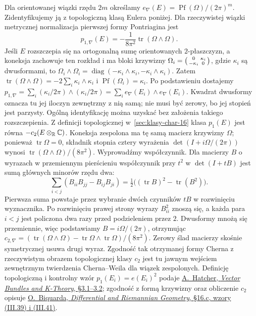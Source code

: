 \begin{przyklad}
\label{prz:euler-p1-CW-26}
Dla orientowanej wiązki rzędu $2m$ określamy
$e_\nabla(E)=\operatorname{Pf}(\Omega)/(2\pi)^m$.
Zidentyfikujemy ją z topologiczną klasą
Eulera poniżej. Dla rzeczywistej wiązki
metrycznej normalizacja pierwszej formy
Pontriagina jest
\[
 p_{1,\nabla}(E)=
 -\frac{1}{8\pi^2}\operatorname{tr}
                (\Omega\wedge\Omega).
\]
Jeśli $E$ rozszczepia się na ortogonalną
sumę orientowanych $2$-płaszczyzn,
a koneksja zachowuje ten rozkład
i ma bloki krzywizny
$\Omega_i=\begin{psmallmatrix}0&\kappa_i\\-\kappa_i&0\end{psmallmatrix}$,
gdzie $\kappa_i$ są dwusformami, to
$\Omega_i\wedge\Omega_i
=\operatorname{diag}(-\kappa_i\wedge\kappa_i,
                     -\kappa_i\wedge\kappa_i)$.
Zatem $\operatorname{tr}(\Omega\wedge\Omega)
=-2\sum_i\kappa_i\wedge\kappa_i$ i
$\operatorname{Pf}(\Omega_i)=\kappa_i$.
Po podstawieniu dostajemy
$p_{1,\nabla}=\sum_i(\kappa_i/2\pi)\wedge(\kappa_i/2\pi)
=\sum_i e_\nabla(E_i)\wedge e_\nabla(E_i)$.
Kwadrat dwusformy oznacza tu jej iloczyn zewnętrzny
z nią samą; nie musi być zerowy, bo jej stopień jest parzysty.
Ogólną identyfikację można uzyskać bez
założenia takiego rozszczepienia. Z definicji
topologicznej w~\ref{sec:klasy-char-16}
klasa $p_1(E)$ jest równa
$-c_2(E\otimes_{\mathbb{R}}\mathbb{C})$. Koneksja zespolona
ma tę samą macierz krzywizny $\Omega$;
ponieważ $\operatorname{tr}\Omega=0$,
składnik stopnia cztery wyrażenia
$\det(I+i\Omega/(2\pi))$ wynosi
$\operatorname{tr}(\Omega\wedge\Omega)/(8\pi^2)$.
Wyprowadźmy współczynnik. Dla macierzy $B$ o wyrazach
w przemiennym pierścieniu współczynnik przy $t^2$
w $\det(I+tB)$ jest sumą głównych minorów rzędu dwa:
\[
 \sum_{i<j}(B_{ii}B_{jj}-B_{ij}B_{ji})
 =\tfrac12\bigl((\operatorname{tr}B)^2-\operatorname{tr}(B^2)\bigr).
\]
Pierwsza suma powstaje przez wybranie dwóch czynników $tB$
w rozwinięciu wyznacznika. Po rozwinięciu prawej strony
wyrazy $B_{ii}^2$ znoszą się, a każda para $i<j$
jest policzona dwa razy przed podzieleniem przez $2$.
Dwusformy mnożą się przemiennie, więc podstawiamy
$B=i\Omega/(2\pi)$, otrzymując
$c_{2,\nabla}=(\operatorname{tr}(\Omega\wedge\Omega)
-\operatorname{tr}\Omega\wedge\operatorname{tr}\Omega)/(8\pi^2)$.
Zerowy ślad macierzy skośnie symetrycznej usuwa drugi wyraz.
Zgodność tak otrzymanej formy Cherna
z rzeczywistym obrazem topologicznej klasy
$c_2$ jest tu jawnym wejściem zewnętrznym
twierdzenia Cherna--Weila dla wiązek zespolonych.
Definicję topologiczną i kontrolny wzór
$p_1(E_i)=e(E_i)^2$ podaje
\href{https://pi.math.cornell.edu/~hatcher/VBKT/VB.pdf}
{A.\ Hatcher, \emph{Vector Bundles and K-Theory},
§3.1--3.2}; zgodność z formą krzywizny
oraz obliczenie $c_2$ opisuje
\href{https://webusers.imj-prg.fr/~olivier.biquard/m2dg2022.pdf}
{O.\ Biquarda, \emph{Differential and Riemannian Geometry},
§16.c, wzory (III.39) i (III.41)}.
\end{przyklad}

